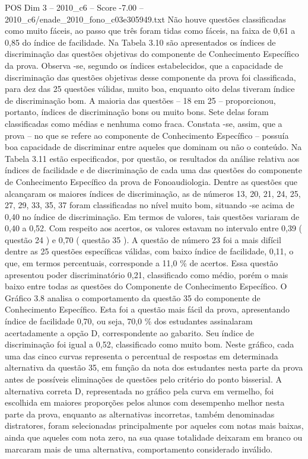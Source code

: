 \begin{textsample}{POS Dim 3 – 2010\_c6 – Score -7.00 – 2010\_c6/enade\_2010\_fono\_c03e305949.txt}
Não houve questões classificadas como muito fáceis, ao passo que três foram tidas como fáceis, na faixa de 0,61 a 0,85 do índice de facilidade.
Na Tabela 3.10 são apresentados os índices de discriminação das questões objetivas do componente de Conhecimento Específico da prova.
Observa -se, segundo os índices estabelecidos, que a capacidade de discriminação das questões objetivas desse componente da prova foi classificada, para dez das 25 questões válidas, muito boa, enquanto oito delas tiveram índice de discriminação bom.
A maioria das questões – 18 em 25 – proporcionou, portanto, índices de discriminação bons ou muito bons.
Sete delas foram classificadas como médias e nenhuma como fraca.
Constata -se, assim, que a prova – no que se refere ao componente de Conhecimento Específico – possuía boa capacidade de discriminar entre aqueles que dominam ou não o conteúdo.
Na Tabela 3.11 estão especificados, por questão, os resultados da análise relativa aos índices de facilidade e de discriminação de cada uma das questões do componente de Conhecimento Específico da prova de Fonoaudiologia.
Dentre as questões que alcançaram os maiores índices de discriminação, as de números 13, 20, 21, 24, 25, 27, 29, 33, 35, 37 foram classificadas no nível muito bom, situando -se acima de 0,40 no índice de discriminação.
Em termos de valores, tais questões variaram de 0,40 a 0,52.
Com respeito aos acertos, os valores estavam no intervalo entre 0,39 ( questão 24 ) e 0,70 ( questão 35 ).
A questão de número 23 foi a mais difícil dentre as 25 questões específicas válidas, com baixo índice de facilidade, 0,11, o que, em termos percentuais, corresponde a 11,0 \% de acertos.
Essa questão apresentou poder discriminatório 0,21, classificado como médio, porém o mais baixo entre todas as questões do Componente de Conhecimento Específico.
O Gráfico 3.8 analisa o comportamento da questão 35 do componente de Conhecimento Específico.
Esta foi a questão mais fácil da prova, apresentando índice de facilidade 0,70, ou seja, 70,0 \% dos estudantes assinalaram acertadamente a opção D, correspondente ao gabarito.
Seu índice de discriminação foi igual a 0,52, classificado como muito bom.
Neste gráfico, cada uma das cinco curvas representa o percentual de respostas em determinada alternativa da questão 35, em função da nota dos estudantes nesta parte da prova antes de possíveis eliminações de questões pelo critério do ponto bisserial.
A alternativa correta D, representada no gráfico pela curva em vermelho, foi escolhida em maiores proporções pelos alunos com desempenho melhor nesta parte da prova, enquanto as alternativas incorretas, também denominadas distratores, foram selecionadas principalmente por aqueles com notas mais baixas, ainda que aqueles com nota zero, na sua quase totalidade deixaram em branco ou marcaram mais de uma alternativa, comportamento considerado inválido.

\end{textsample}
